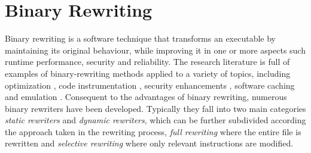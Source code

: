 \chapter{Binary Rewriting}
\label{binary_rewriting}

Binary rewriting is a software technique that transforms an executable by maintaining its original behaviour, while improving it in one or more aspects such runtime performance, security and reliability. The research literature is full of examples of binary-rewriting methods applied to a variety of topics, including optimization \cite{Romer97instrumentationand}, code instrumentation \cite{PEBIL, BIRD}, security enhancements \cite{vx32}, software caching \cite{Valgrind, DynamoRio} and emulation \cite{Qemu}. Consequent to the advantages of binary rewriting, numerous binary rewriters have been developed. Typically they fall into two main categories \emph{static rewriters} and \emph{dynamic rewriters}, which can be further subdivided according the approach taken in the rewriting process, \emph{full rewriting} where the entire file is rewritten and \emph{selective rewriting} where only relevant instructions are modified. 

